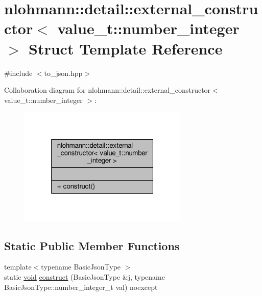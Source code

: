 \hypertarget{structnlohmann_1_1detail_1_1external__constructor_3_01value__t_1_1number__integer_01_4}{}\section{nlohmann\+:\+:detail\+:\+:external\+\_\+constructor$<$ value\+\_\+t\+:\+:number\+\_\+integer $>$ Struct Template Reference}
\label{structnlohmann_1_1detail_1_1external__constructor_3_01value__t_1_1number__integer_01_4}


{\ttfamily \#include $<$to\+\_\+json.\+hpp$>$}



Collaboration diagram for nlohmann\+:\+:detail\+:\+:external\+\_\+constructor$<$ value\+\_\+t\+:\+:number\+\_\+integer $>$\+:\nopagebreak
\begin{figure}[H]
\begin{center}
\leavevmode
\includegraphics[width=229pt]{structnlohmann_1_1detail_1_1external__constructor_3_01value__t_1_1number__integer_01_4__coll__graph}
\end{center}
\end{figure}
\subsection*{Static Public Member Functions}
\begin{DoxyCompactItemize}
\item 
{\footnotesize template$<$typename Basic\+Json\+Type $>$ }\\static \hyperlink{namespacenlohmann_1_1detail_a59fca69799f6b9e366710cb9043aa77d}{void} \hyperlink{structnlohmann_1_1detail_1_1external__constructor_3_01value__t_1_1number__integer_01_4_a7c3949672ddb45095cc2527635feef0b}{construct} (Basic\+Json\+Type \&j, typename Basic\+Json\+Type\+::number\+\_\+integer\+\_\+t val) noexcept
\end{DoxyCompactItemize}


